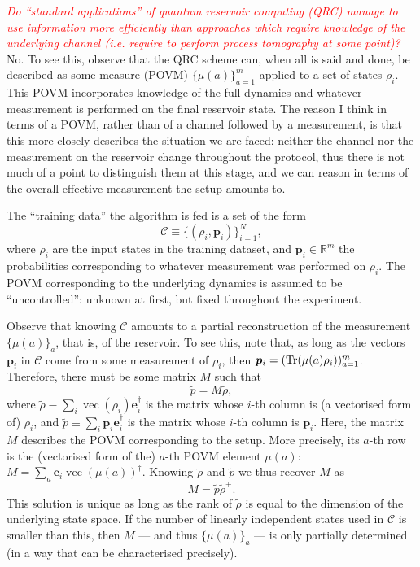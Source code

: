 \documentclass[12pt]{report}
\newcommand{\RR}{\mathbb{R}}
\newcommand{\on}[1]{\operatorname{#1}}
\newcommand{\bs}[1]{\boldsymbol{#1}}
\newcommand{\calC}{{\mathcal{C}}}
\begin{document}
\textcolor{red}{\emph{Do ``standard applications'' of quantum reservoir computing (QRC) manage to use information more efficiently than approaches which require knowledge of the underlying channel (\emph{i.e.} require to perform process tomography at some point)?}}
No. To see this, observe that the QRC scheme can, when all is said and done, be described as some measure (POVM) $\{\mu(a)\}_{a=1}^m$ applied to a set of states $\rho_i$. This POVM incorporates knowledge of the full dynamics and whatever measurement is performed on the final reservoir state.
The reason I think in terms of a POVM, rather than of a channel followed by a measurement, is that this more closely describes the situation we are faced: neither the channel nor the measurement on the reservoir change throughout the protocol, thus there is not much of a point to distinguish them at this stage, and we can reason in terms of the overall effective measurement the setup amounts to.

The ``training data'' the algorithm is fed is a set of the form
\begin{equation}
	\calC \equiv \{ (\rho_i, \bs p_i) \}_{i=1}^N,
\end{equation}
where $\rho_i$ are the input states in the training dataset, and $\bs p_i\in\RR^m$ the probabilities corresponding to whatever measurement was performed on $\rho_i$.
The POVM corresponding to the underlying dynamics is assumed to be ``uncontrolled'': unknown at first, but fixed throughout the experiment.

Observe that knowing $\calC$ amounts to a partial reconstruction of the measurement $\{\mu(a)\}_a$, that is, of the reservoir. To see this, note that, as long as the vectors $\bs p_i$ in $\calC$ come from some measurement of $\rho_i$, then $\bs p_i= (\Tr(\mu(a)\rho_i))_{a=1}^m$.
Therefore, there must be some matrix $M$ such that
\begin{equation}
	\tilde p = M \tilde \rho,
\end{equation}
where $\tilde\rho\equiv \sum_i \on{vec}(\rho_i)\bs e_i^\dagger$ is the matrix whose $i$-th column is (a vectorised form of) $\rho_i$, and $\tilde p\equiv \sum_i \bs p_i \bs e_i^\dagger$ is the matrix whose $i$-th column is $\bs p_i$.
Here, the matrix $M$ describes the POVM corresponding to the setup.
More precisely, its $a$-th row is the (vectorised form of the) $a$-th POVM element $\mu(a)$:
$M= \sum_a \bs e_i \on{vec}(\mu(a))^\dagger$.
Knowing $\tilde\rho$ and $\tilde p$ we thus recover $M$ as
\begin{equation}\label{eq:QRC_POVM_from_trainingdataset}
	M = \tilde p \tilde\rho^+.
\end{equation}
This solution is unique as long as the rank of $\tilde\rho$ is equal to the dimension of the underlying state space. If the number of linearly independent states used in $\calC$ is smaller than this, then $M$ --- and thus $\{\mu(a)\}_a$ --- is only partially determined (in a way that can be characterised precisely).
\end{document}
